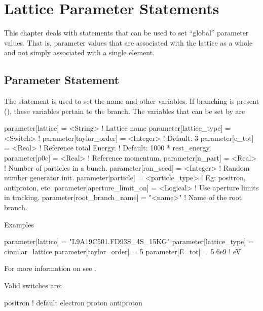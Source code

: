 \chapter{Lattice Parameter Statements}

This chapter deals with statements that can be used to set ``global''
parameter values. That is, parameter values that are associated with
the lattice as a whole and not simply associated with a single element.

\section{Parameter Statement}
\label{s:param}


The  statement is used to set the  name and
other variables. If branching is present (), these
variables pertain to the  branch. The variables that can be
set by  are
\begin{example}
  parameter[lattice]      = <String>        ! Lattice name 
  parameter[lattice_type] = <Switch>        ! 
  parameter[taylor_order] = <Integer>       ! Default: 3
  parameter[e_tot]        = <Real>          ! Reference total Energy. 
                                            !      Default: 1000 * rest_energy.
  parameter[p0c]          = <Real>          ! Reference momentum.
  parameter[n_part]       = <Real>          ! Number of particles in a bunch.
  parameter[ran_seed]     = <Integer>       ! Random number generator init.
  parameter[particle]     = <particle_type> ! Eg: positron, antiproton, etc.
  parameter[aperture_limit_on] = <Logical>  ! Use aperture limits in tracking.
  parameter[root_branch_name]  = "<name>"   ! Name of the root branch.
\end{example}

\noindent
Examples
\begin{example}
  parameter[lattice]      = "L9A19C501.FD93S_4S_15KG"
  parameter[lattice_type] = circular_lattice
  parameter[taylor_order] = 5
  parameter[E_tot]        = 5.6e9    ! eV
\end{example}

For more information on  see .

Valid  switches are:
\begin{example}
  positron  ! default
  electron
  proton
  antiproton
\end{example}

